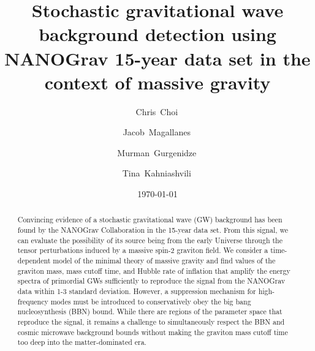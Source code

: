 \documentclass[prd,twocolumn,aps,psfig,nofootinbib,nobibnotes,superscriptaddress,preprintnumbers,times]{revtex4-2}
\begin{document}
\title{Stochastic gravitational wave background detection using NANOGrav 15-year data set in the context of massive gravity}
\date{\today}
\author{Chris~Choi\,}

\author{Jacob~Magallanes\,}

\author{Murman~Gurgenidze\,}

\author{Tina~Kahniashvili\,}

\begin{abstract}
Convincing evidence of a stochastic gravitational wave (GW) background has been found by the NANOGrav Collaboration in the 15-year data set. From this signal, we can evaluate the possibility of its source being from the early Universe through the tensor perturbations induced by a massive spin-2 graviton field. We consider a time-dependent model of the minimal theory of massive gravity and find values of the graviton mass, mass cutoff time, and Hubble rate of inflation that amplify the energy spectra of primordial GWs sufficiently to reproduce the signal from the NANOGrav data within 1-3 standard deviation. However, a suppression mechanism for high-frequency modes must be introduced to conservatively obey the big bang nucleosynthesis (BBN) bound. While there are regions of the parameter space that reproduce the signal, it remains a challenge to simultaneously respect the BBN and cosmic microwave background bounds without making the graviton mass cutoff time too deep into the matter-dominated era.
\end{abstract}
\end{document}
